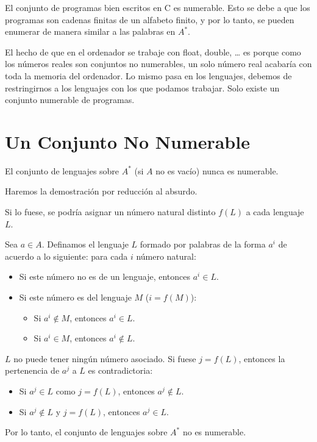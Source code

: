 \documentclass[12pt]{report} %
\begin{document}
\begin{ejemplo}
El conjunto de programas bien escritos en C es numerable. Esto se debe a que los programas son cadenas finitas de un alfabeto finito, y por lo tanto, se pueden enumerar de manera similar a las palabras en $A^*$.  
\end{ejemplo}

El hecho de que en el ordenador se trabaje con float, double, \ldots{}
es porque como los números reales son conjuntos no numerables, un solo
número real acabaría con toda la memoria del ordenador. Lo mismo pasa en
los lenguajes, debemos de restringirnos a los lenguajes con los que
podamos trabajar. Solo existe un conjunto numerable de programas.

\hypertarget{un-conjunto-no-numerable}{%
\section{Un Conjunto No Numerable}\label{un-conjunto-no-numerable}}

\begin{ejemplo}
El conjunto de lenguajes sobre $A^*$ (si $A$ no es vacío) nunca es numerable.  
\end{ejemplo}

Haremos la demostración por reducción al absurdo.\\

\begin{demostracion}
Si lo fuese, se podría asignar un número natural distinto $f(L)$ a cada lenguaje $L$.  

Sea $a \in A$.  
Definamos el lenguaje $L$ formado por palabras de la forma $a^i$ de acuerdo a lo siguiente: para cada $i$ número natural:  
\begin{itemize}
    \item Si este número no es de un lenguaje, entonces $a^i \in L$.  
    \item Si este número es del lenguaje $M$ ($i = f(M)$):  
        \begin{itemize}
            \item Si $a^i \notin M$, entonces $a^i \in L$.  
            \item Si $a^i \in M$, entonces $a^i \notin L$.  
        \end{itemize}
\end{itemize}

$L$ no puede tener ningún número asociado. Si fuese $j = f(L)$, entonces la pertenencia de $a^j$ a $L$ es contradictoria:  
\begin{itemize}
    \item Si $a^j \in L$ como $j = f(L)$, entonces $a^j \notin L$.  
    \item Si $a^j \notin L$ y $j = f(L)$, entonces $a^j \in L$.  
\end{itemize}

Por lo tanto, el conjunto de lenguajes sobre $A^*$ no es numerable.  
\end{demostracion}
\end{document}
